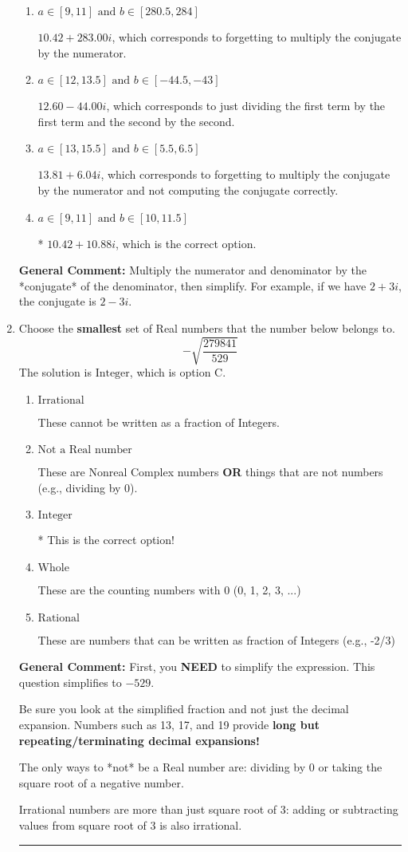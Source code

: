 \documentclass{extbook}[14pt]
\newcommand{\litem}[1]{\item #1

\rule{\textwidth}{0.4pt}}
\begin{document}
\begin{enumerate}
{\begin{enumerate}[label=\Alph*.]
 $271.00  + 10.88 i$, which corresponds to forgetting to multiply the conjugate by the numerator and using a plus instead of a minus in the denominator.
\item \( a \in [9, 11] \text{ and } b \in [280.5, 284] \)

 $10.42  + 283.00 i$, which corresponds to forgetting to multiply the conjugate by the numerator.
\item \( a \in [12, 13.5] \text{ and } b \in [-44.5, -43] \)

 $12.60  - 44.00 i$, which corresponds to just dividing the first term by the first term and the second by the second.
\item \( a \in [13, 15.5] \text{ and } b \in [5.5, 6.5] \)

 $13.81  + 6.04 i$, which corresponds to forgetting to multiply the conjugate by the numerator and not computing the conjugate correctly.
\item \( a \in [9, 11] \text{ and } b \in [10, 11.5] \)

* $10.42  + 10.88 i$, which is the correct option.
\end{enumerate}

\textbf{General Comment:} Multiply the numerator and denominator by the *conjugate* of the denominator, then simplify. For example, if we have $2+3i$, the conjugate is $2-3i$.
}
\litem{
Choose the \textbf{smallest} set of Real numbers that the number below belongs to.
\[ -\sqrt{\frac{279841}{529}} \]The solution is \( \text{Integer} \), which is option C.\begin{enumerate}[label=\Alph*.]
\item \( \text{Irrational} \)

These cannot be written as a fraction of Integers.
\item \( \text{Not a Real number} \)

These are Nonreal Complex numbers \textbf{OR} things that are not numbers (e.g., dividing by 0).
\item \( \text{Integer} \)

* This is the correct option!
\item \( \text{Whole} \)

These are the counting numbers with 0 (0, 1, 2, 3, ...)
\item \( \text{Rational} \)

These are numbers that can be written as fraction of Integers (e.g., -2/3)
\end{enumerate}

\textbf{General Comment:} First, you \textbf{NEED} to simplify the expression. This question simplifies to $-529$. 
 
 Be sure you look at the simplified fraction and not just the decimal expansion. Numbers such as 13, 17, and 19 provide \textbf{long but repeating/terminating decimal expansions!} 
 
 The only ways to *not* be a Real number are: dividing by 0 or taking the square root of a negative number. 
 
 Irrational numbers are more than just square root of 3: adding or subtracting values from square root of 3 is also irrational.
}
\end{enumerate}
\end{document}
